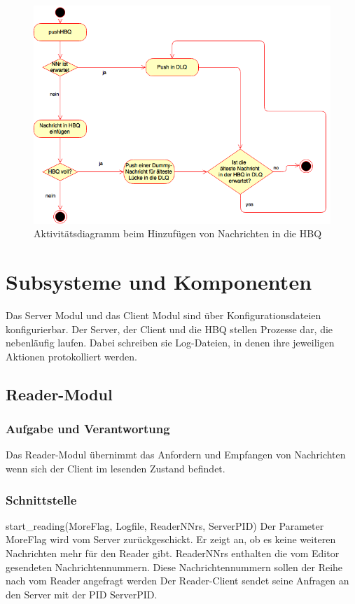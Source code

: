 \documentclass{article}
\begin{document}
\begin{figure}[H]
\centering
\includegraphics[width=\textwidth]{FullHBQSequence.png}
\caption[seq-dia]{Aktivitätsdiagramm beim Hinzufügen von Nachrichten in die HBQ}
\label{fig:acivity-diagram}
\end{figure}

\newpage

\section{Subsysteme und Komponenten}
Das Server Modul und das Client Modul sind über Konfigurationsdateien konfigurierbar. Der Server, der Client und die HBQ
stellen Prozesse dar, die nebenläufig laufen. Dabei schreiben sie Log-Dateien, in denen ihre jeweiligen Aktionen
protokolliert werden.

\subsection{Reader-Modul}
\subsubsection{Aufgabe und Verantwortung}
Das Reader-Modul übernimmt das Anfordern und Empfangen von Nachrichten wenn sich der Client
im lesenden Zustand befindet.
\subsubsection{Schnittstelle}
start_reading(MoreFlag, Logfile, ReaderNNrs, ServerPID)\newline
Der Parameter MoreFlag wird vom Server zurückgeschickt. Er zeigt an, ob es keine weiteren 
Nachrichten mehr für den Reader gibt. \newline
ReaderNNrs enthalten die vom Editor gesendeten Nachrichtennummern. Diese Nachrichtennummern
sollen der Reihe nach vom Reader angefragt werden \newline
Der Reader-Client sendet seine Anfragen an den Server mit der PID ServerPID.
\end{document}
